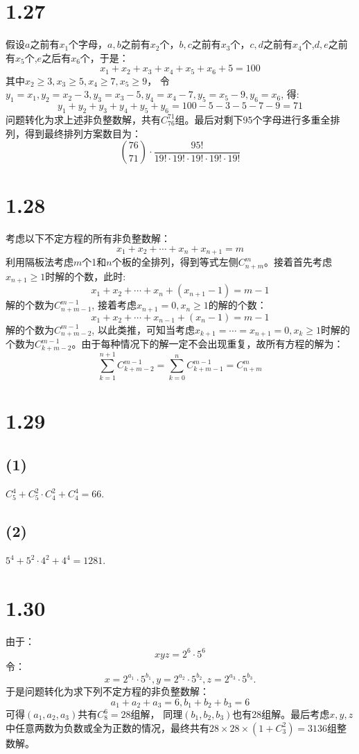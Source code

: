 \documentclass[UTF8,oneside]{article}
\begin{document}
\section{1.27}
假设$a$之前有$x_1$个字母，$a,b$之前有$x_2$个，$b,c$之前有$x_3$个，$c,d$之前有$x_4$个,$d,e$之前有$x_5$个,$e$之后有$x_6$个，于是：
\[
    x_1 + x_2 + x_3 + x_4 + x_5 + x_6 + 5 = 100
\]
其中$x_2\ge 3, x_3\ge 5, x_4\ge 7, x_5\ge 9$， 令$y_1=x_1, y_2 = x_2 - 3, y_3 = x_3 - 5, y_4 = x_4 - 7, y_5 = x_5-9, y_6=x_6$, 得:
\[
    y_1 + y_2 + y_3 + y_4 + y_5 + y_6 = 100 - 5 - 3 - 5 - 7 - 9 = 71
\]
问题转化为求上述非负整数解，共有$C^{71}_{76}$组。最后对剩下95个字母进行多重全排列，得到最终排列方案数目为：
\[
     \binom{76}{71} \cdot \frac{95!}{19!\cdot 19! \cdot 19! \cdot 19! \cdot 19!}
\]


\section{1.28}
考虑以下不定方程的所有非负整数解：
\[
    x_1 + x_2 + \cdots + x_n + x_{n+1} = m
\]
利用隔板法考虑$m$个1和$n$个板的全排列，得到等式左侧$C^{m}_{n+m}$。接着首先考虑$x_{n+1}\ge 1$时解的个数，此时:
\[
    x_1 + x_2 + \cdots + x_n + (x_{n+1} - 1) = m - 1
\]
解的个数为$C^{m-1}_{n+m-1}$, 接着考虑$x_{n+1}=0, x_n\ge 1$的解的个数：
\[
    x_1 + x_2 + \cdots + x_{n-1} + (x_{n} - 1) = m - 1
\]
解的个数为$C^{m-1}_{n+m-2}$, 以此类推，可知当考虑$x_{k+1}=\cdots=x_{n+1}=0, x_k\ge 1$时解的个数为$C^{m-1}_{k+m-2}$。由于每种情况下的解一定不会出现重复，故所有方程的解为：
\[
    \sum_{k=1}^{n+1} C^{m-1}_{k+m-2} = \sum_{k=0}^{n} C^{m-1}_{k+m-1} = C^{m}_{n+m}
\]

\section{1.29}
\subsection{(1)} $C^4_5 + C^2_5\cdot C^2_4 + C^4_4 = 66$.
\subsection{(2)} $5^4 + 5^2\cdot 4^2 + 4^4 = 1281$.


\section{1.30}
由于：
\[
    xyz = 2^6 \cdot 5^6
\]
令：
\[
    x = 2^{a_1}\cdot 5^{b_1}, y = 2^{a_2}\cdot 5^{b_2}, z = 2^{a_3}\cdot 5^{b_3}.
\]
于是问题转化为求下列不定方程的非负整数解：
\[
    a_1+a_2+a_3 = 6, b_1 + b_2 + b_3 = 6
\]
可得$(a_1, a_2, a_3)$共有$C^6_{8}=28$组解， 同理$(b_1, b_2, b_3)$也有28组解。最后考虑$x,y,z$中任意两数为负数或全为正数的情况，最终共有$28\times 28 \times (1 + C^2_3) = 3136$组整数解。
\end{document}
